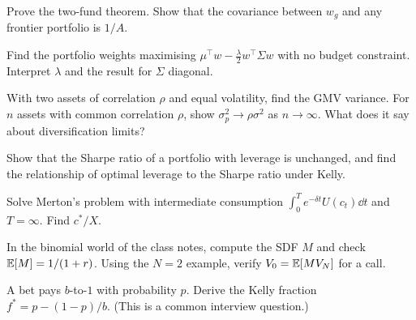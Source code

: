 \begin{exercises}
\item Prove the two-fund theorem. Show that the covariance between $w_g$ and any frontier portfolio is $1/A$.
\item Find the portfolio weights maximising $\mu^\top w-\frac\lambda2w^\top\Sigma w$ with no budget constraint. Interpret $\lambda$ and the result for $\Sigma$ diagonal.
\item With two assets of correlation $\rho$ and equal volatility, find the GMV variance. For $n$ assets with common correlation $\rho$, show $\sigma^2_p\to\rho\sigma^2$ as $n\to\infty$. What does it say about diversification limits?
\item Show that the Sharpe ratio of a portfolio with leverage is unchanged, and find the relationship of optimal leverage to the Sharpe ratio under Kelly.
\item Solve Merton's problem with intermediate consumption $\int_0^Te^{-\delta t}U(c_t)\dd t$ and $T=\infty$. Find $c^*/X$.
\item In the binomial world of the class notes, compute the SDF $M$ and check $\mathbb{E}[M]=1/(1+r)$. Using the $N=2$ example, verify $V_0=\mathbb{E}[MV_N]$ for a call.
\item A bet pays $b$-to-$1$ with probability $p$. Derive the Kelly fraction $f^*=p-(1-p)/b$. (This is a common interview question.)
\end{exercises}
